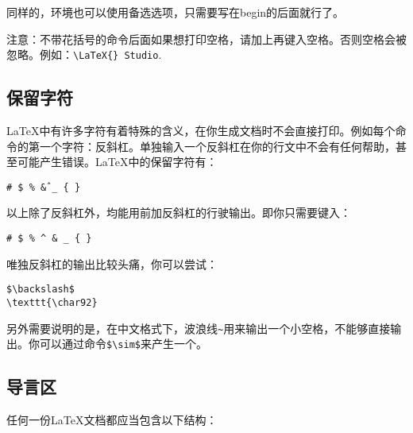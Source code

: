 同样的，环境也可以使用备选选项，只需要写在begin的后面就行了。

注意：不带花括号的命令后面如果想打印空格，请加上再键入空格。否则空格会被忽略。例如：\verb+\LaTeX{} Studio+. 

\subsection{保留字符}

\LaTeX 中有许多字符有着特殊的含义，在你生成文档时不会直接打印。例如每个命令的第一个字符：反斜杠。单独输入一个反斜杠在你的行文中不会有任何帮助，甚至可能产生错误。\LaTeX 中的保留字符有：
\begin{center}
\texttt{\# \$ \% \^ \& \_ \{ \} }
\end{center}

以上除了反斜杠外，均能用前加反斜杠的行驶输出。即你只需要键入：
\begin{center}
\texttt{\# \$ \% \^{} \& \_
	\{ \} }
\end{center}

唯独反斜杠的输出比较头痛，你可以尝试：
\begin{verbatim}
$\backslash$
\texttt{\char92}
\end{verbatim}

另外需要说明的是，在中文格式下，波浪线{\texttt{\~}}用来输出一个小空格，不能够直接输出。你可以通过命令\verb+$\sim$+来产生一个。

\subsection{导言区}
任何一份\LaTeX{}文档都应当包含以下结构：


